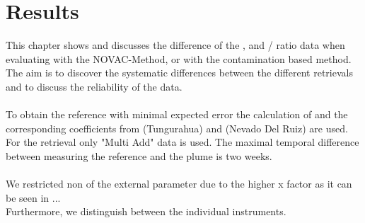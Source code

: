 \documentclass  [
  paper    = a4,
  BCOR     = 10mm,
  twoside,
  fontsize = 12pt,
  fleqn,
  toc      = bibnumbered,
  toc      = listofnumbered,
  numbers  = noendperiod,
  headings = normal,
  listof   = leveldown,
  version  = 3.03
]                                       {scrreprt}
\begin{document}
	\chapter{Results}
	This chapter shows and discusses the difference of the ,  and /  ratio data when evaluating with the NOVAC-Method, or with the contamination based method.
	The aim is to discover the systematic differences between the different retrievals and to discuss the reliability of the data.\\
	\\
	To obtain the reference with minimal expected   error the calculation of  and the corresponding coefficients from  (Tungurahua) and  (Nevado Del Ruiz) are used. 
	For the retrieval only "Multi Add" data is used. The maximal temporal difference between measuring the reference and the plume is two weeks.\\
	\\
	We restricted non of the external parameter due to the higher x factor as it can be seen in ...\\
	Furthermore, we distinguish between the individual instruments.\\
\end{document}
